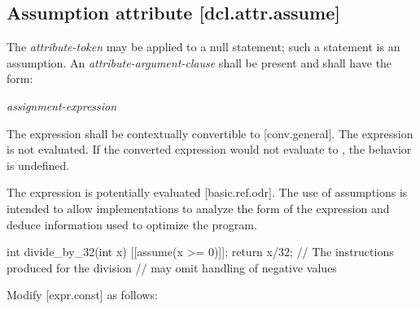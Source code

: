\begin{adjustwidth}{0.5cm}{0.5cm}
\begin{addedblock}
\subsection*{Assumption attribute \hspace{7.33cm} [dcl.attr.assume]}

The \textit{attribute-token}  may be applied to a null statement; such a statement is an assumption. An \textit{attribute-argument-clause} shall be present and shall have the form:

\hspace{5mm}\tcode{( }\textit{assignment-expression}\tcode{ )}

The expression shall be contextually convertible to  [conv.general]. The expression is not evaluated. If the converted expression would not evaluate to , the behavior is undefined.

\begin{note}
The expression is potentially evaluated [basic.ref.odr]. The use of assumptions is intended to allow implementations to analyze the form of the expression and deduce information used to optimize the program.
\end{note}

\begin{example}
\begin{codeblock}
int divide_by_32(int x)  {
    [[assume(x >= 0)]];
    return x/32;   // The instructions produced for the division
                   //  may omit handling of negative values
}
\end{codeblock}
\end{example}
\end{addedblock}
\end{adjustwidth}

Modify [expr.const] as follows:

